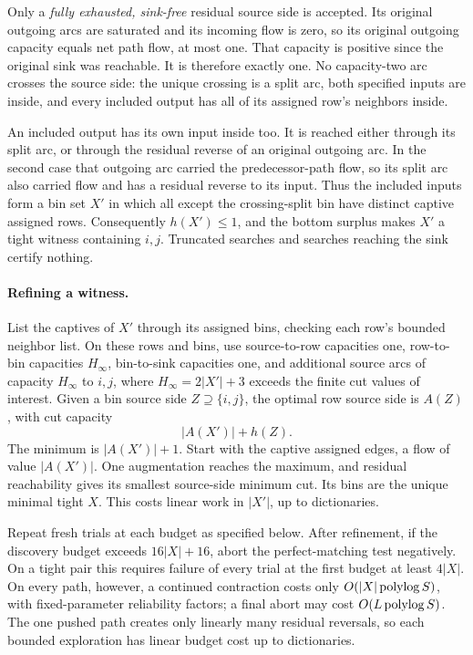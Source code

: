 Only a \emph{fully exhausted, sink-free} residual source side is
accepted.  Its original outgoing arcs are saturated and its incoming
flow is zero, so its original outgoing capacity equals net path flow,
at most one.  That capacity is positive since the original sink was
reachable.  It is therefore exactly one.  No capacity-two arc crosses
the source side: the unique crossing is a split arc, both specified
inputs are inside, and every included output has all of its assigned
row's neighbors inside.

An included output has its own input inside too.  It is reached either
through its split arc, or through the residual reverse of an original
outgoing arc.  In the second case that outgoing arc carried the
predecessor-path flow, so its split arc also carried flow and has
a residual reverse to its input.  Thus the included inputs form a
bin set \(X'\) in which all except the crossing-split bin have distinct
captive assigned rows.  Consequently \(h(X')\le1\), and the bottom
surplus makes \(X'\) a tight witness containing \(i,j\).
Truncated searches and searches reaching the sink certify nothing.

\paragraph{Refining a witness.}
List the captives of \(X'\) through its assigned bins, checking each
row's bounded neighbor list.  On these rows and bins, use source-to-row
capacities one, row-to-bin capacities \(H_\infty\), bin-to-sink
capacities one, and additional source arcs of capacity \(H_\infty\)
to \(i,j\), where \(H_\infty=2|X'|+3\) exceeds the finite cut values
of interest.  Given a bin source side \(Z\supseteq\{i,j\}\), the
optimal row source side is \(A(Z)\), with cut capacity
\[
                             |A(X')|+h(Z).
\]
The minimum is \(|A(X')|+1\).  Start with the captive assigned edges,
a flow of value \(|A(X')|\).  One augmentation reaches the maximum,
and residual reachability gives its smallest source-side minimum cut.
Its bins are the unique minimal tight \(X\).  This costs linear
work in \(|X'|\), up to dictionaries.

Repeat fresh trials at each budget as specified below.
After refinement, if the discovery budget exceeds \(16|X|+16\),
abort the perfect-matching test negatively.  On a tight pair this
requires failure of every trial at the first budget at least
\(4|X|\).  On every path, however, a continued contraction costs
only \(O(|X|\operatorname{polylog} S)\), with fixed-parameter reliability factors;
a final abort may cost \(O(L\operatorname{polylog} S)\).
The one pushed path creates only linearly many residual reversals,
so each bounded exploration has linear budget cost up to dictionaries.

